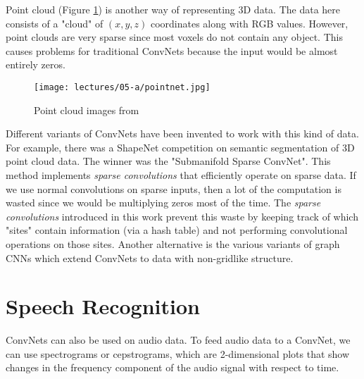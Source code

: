 Point cloud (Figure \ref{fig:pointcloud}) is another way of representing 3D data. The data here consists of a "cloud" of $(x,y,z)$  coordinates along with RGB values. However, point clouds are very sparse since most voxels do not contain any object. This causes problems for traditional ConvNets because the input would be almost entirely zeros.

\begin{figure}[ht]
    \centering
    \texttt{[image: lectures/05-a/pointnet.jpg]}
    \caption{Point cloud images from \citep{qi2017pointnet}}
    \label{fig:pointcloud}
\end{figure}
Different variants of ConvNets have been invented to work with this kind of data. For example, there was a ShapeNet competition on semantic segmentation of 3D point cloud data.
The winner was the "Submanifold Sparse ConvNet". This method implements {\it sparse convolutions} that efficiently operate on sparse data. If we use normal convolutions on sparse inputs, then a lot of the computation is wasted since we would be multiplying zeros most of the time. The {\it sparse convolutions} introduced in this work prevent this waste by keeping track of which "sites" contain information (via a hash table) and not performing convolutional operations on those sites. Another alternative is the various variants of graph CNNs which extend ConvNets to data with non-gridlike structure.

\section{Speech Recognition}
ConvNets can also be used on audio data. To feed audio data to a ConvNet, we can use spectrograms or cepstrograms, which are 2-dimensional plots that show changes in the frequency component of the audio signal with respect to time.


